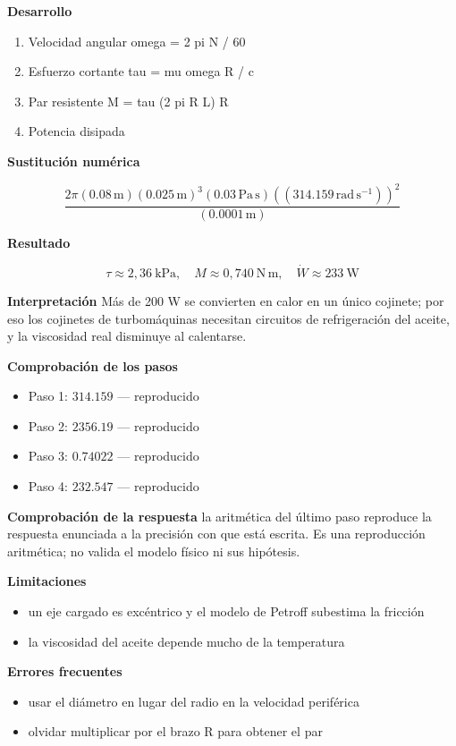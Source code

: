 \documentclass[10pt,openany]{book}
\begin{document}
\begin{tcolorbox}[title={Problema resuelto}, studiumworked, breakable]
\noindent\textbf{Desarrollo}
\begin{enumerate}
\item
Velocidad angular omega = 2 pi N / 60
\item
Esfuerzo cortante tau = mu omega R / c
\item
Par resistente M = tau (2 pi R L) R
\item
Potencia disipada
\end{enumerate}

\noindent\textbf{Sustitución numérica}

\[
\frac{2 \pi \left(0.08\,\mathrm{m}\right) \left(0.025\,\mathrm{m}\right)^{3} \left(0.03\,\mathrm{Pa}\,\mathrm{s}\right) \left(\left(314.159\,\mathrm{rad}\,\mathrm{s}^{-1}\right)\right)^{2}}{\left(0.0001\,\mathrm{m}\right)}
\]

\noindent\textbf{Resultado}

\[
\tau \approx 2{,}36\ \mathrm{kPa},\quad M \approx 0{,}740\ \mathrm{N\,m},\quad \dot W \approx 233\ \mathrm{W}
\]

\noindent\textbf{Interpretación}
Más de 200 W se convierten en calor en un único cojinete; por eso los cojinetes de turbomáquinas necesitan circuitos de refrigeración del aceite, y la viscosidad real disminuye al calentarse.

\noindent\textbf{Comprobación de los pasos}
\begin{itemize}
\item Paso 1: $314.159$ — reproducido
\item Paso 2: $2356.19$ — reproducido
\item Paso 3: $0.74022$ — reproducido
\item Paso 4: $232.547$ — reproducido
\end{itemize}

\noindent\textbf{Comprobación de la respuesta} la aritmética del último paso reproduce la respuesta enunciada a la precisión con que está escrita. Es una reproducción aritmética; no valida el modelo físico ni sus hipótesis.

\noindent\textbf{Limitaciones}
\begin{itemize}
\item un eje cargado es excéntrico y el modelo de Petroff subestima la fricción
\item la viscosidad del aceite depende mucho de la temperatura
\end{itemize}

\noindent\textbf{Errores frecuentes}
\begin{itemize}
\item usar el diámetro en lugar del radio en la velocidad periférica
\item olvidar multiplicar por el brazo R para obtener el par
\end{itemize}
\end{tcolorbox}
\end{document}
